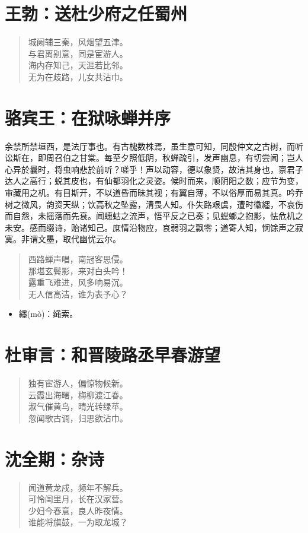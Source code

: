 \documentclass[12pt,oneside]{book}
\newenvironment{shici}{
\begin{verse}
\centering\large\hspace{12pt}}
{\end{verse}}
\begin{document}
\chapter{王勃：送杜少府之任蜀州}
\begin{shici}
城阙辅三秦，风烟望五津。\\
与君离别意，同是宦游人。\\
海内存知己，天涯若比邻。\\
无为在歧路，儿女共沾巾。
\end{shici}

\chapter{骆宾王：在狱咏蝉并序}
余禁所禁垣西，是法厅事也。有古槐数株焉，虽生意可知，同殷仲文之古树，而听讼斯在，即周召伯之甘棠。每至夕照低阴，秋蝉疏引，发声幽息，有切尝闻；岂人心异於曩时，将虫响悲於前听？嗟乎！声以动容，德以象贤，故洁其身也，禀君子达人之高行；蜕其皮也，有仙都羽化之灵姿。候时而来，顺阴阳之数；应节为变，审藏用之机。有目斯开，不以道昏而昧其视；有翼自薄，不以俗厚而易其真。吟乔树之微风，韵资天纵；饮高秋之坠露，清畏人知。仆失路艰虞，遭时徽纆，不哀伤而自怨，未摇落而先衰。闻蟪蛄之流声，悟平反之已奏；见螳螂之抱影，怯危机之未安。感而缀诗，贻诸知己。庶情沿物应，哀弱羽之飘零；道寄人知，悯馀声之寂寞。非谓文墨，取代幽忧云尔。

\begin{shici}
西路蝉声唱，南冠客思侵。\\
那堪玄鬓影，来对白头吟！\\
露重飞难进，风多响易沉。\\
无人信高洁，谁为表予心？
\end{shici}

\begin{itemize}
\item 纆(mò)：绳索。
\end{itemize}

\chapter{杜审言：和晋陵路丞早春游望}
\begin{shici}
独有宦游人，偏惊物候新。\\
云霞出海曙，梅柳渡江春。\\
淑气催黄鸟，晴光转绿苹。\\
忽闻歌古调，归思欲沾巾。
\end{shici}

\chapter{沈全期：杂诗}
\begin{shici}
闻道黄龙戍，频年不解兵。\\
可怜闺里月，长在汉家营。\\
少妇今春意，良人昨夜情。\\
谁能将旗鼓，一为取龙城？
\end{shici}
\end{document}
